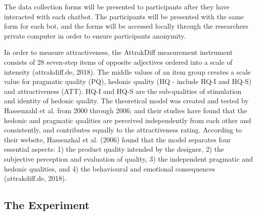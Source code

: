     The data collection forms will be presented to participants after they have interacted with each chatbot. The participants will be presented with the same form for each bot, and the forms will be accessed locally through the researchers private computer in order to ensure participants anonymity. 
    
    In order to measure attractiveness, the AttrakDiff measurement instrument consists of 28 seven-step items of opposite adjectives ordered into a scale of intensity (attrakdiff.de, 2018). The middle values of an item group creates a scale value for pragmatic quality (PQ), hedonic quality (HQ - include HQ-I and HQ-S) and attractiveness (ATT). HQ-I and HQ-S are the sub-qualities of stimulation and identity of hedonic quality. The theoretical model was created and tested by Hassenzahl et al. from 2000 through 2006; and their studies have found that the hedonic and pragmatic qualities are perceived independently from each other and consistently, and contributes equally to the attractiveness rating. According to their website, Hassenzhal et al. (2006) found that the model separates four essential aspects: 1) the product quality intended by the designer, 2) the subjective perception and evaluation of quality, 3) the independent pragmatic and hedonic qualities, and 4) the behavioural and emotional consequences (attrakdiff.de, 2018).

    
   \subsection{The Experiment}
   
